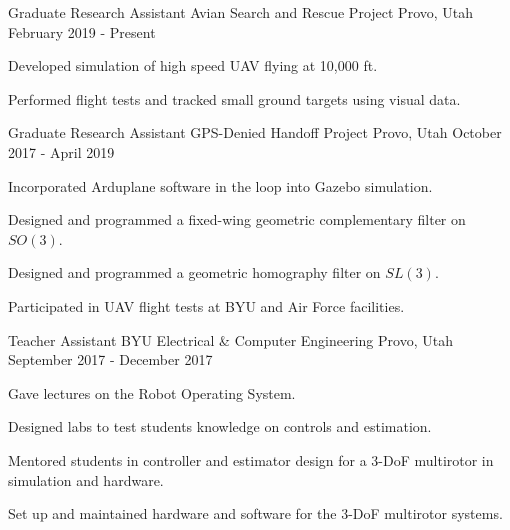 

\begin{cventries}

  \cventry
    {Graduate Research Assistant} %
    {Avian Search and Rescue Project} %
    {Provo, Utah} %
    {February 2019 - Present} %
    {
      \begin{cvitems}
      \item Developed simulation of high speed UAV flying at 10,000 ft.
      \item Performed flight tests and tracked small ground targets using visual data.
      \end{cvitems}
    }

  \cventry
    {Graduate Research Assistant} %
    {GPS-Denied Handoff Project} %
    {Provo, Utah} %
    {October 2017 - April 2019} %
    {
      \begin{cvitems}
        \item Incorporated Arduplane software in the loop into Gazebo simulation.
        \item Designed and programmed a fixed-wing geometric complementary filter on $SO(3)$.
        \item Designed and programmed a geometric homography filter on $SL(3)$.
        \item Participated in UAV flight tests at BYU and Air Force facilities.
      \end{cvitems}
    }

  \cventry
    {Teacher Assistant}
    {BYU Electrical \& Computer Engineering}
    {Provo, Utah}
    {September 2017 - December 2017}
    {
      \begin{cvitems}
        \item Gave lectures on the Robot Operating System.
        \item Designed labs to test students knowledge on controls and estimation.
        \item Mentored students in controller and estimator design for a 3-DoF multirotor in simulation and hardware.
        \item Set up and maintained hardware and software for the 3-DoF multirotor systems.
      \end{cvitems}
    }


\end{cventries}
